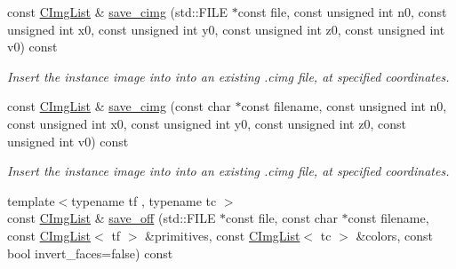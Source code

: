 \begin{DoxyCompactItemize}
\item 
\hypertarget{structcimg__library_1_1_c_img_list_a0445aab3748145df9c6654eaf4ca7947}{const \hyperlink{structcimg__library_1_1_c_img_list}{C\-Img\-List} \& \hyperlink{structcimg__library_1_1_c_img_list_a0445aab3748145df9c6654eaf4ca7947}{save\-\_\-cimg} (std\-::\-F\-I\-L\-E $\ast$const file, const unsigned int n0, const unsigned int x0, const unsigned int y0, const unsigned int z0, const unsigned int v0) const }\label{structcimg__library_1_1_c_img_list_a0445aab3748145df9c6654eaf4ca7947}

\begin{DoxyCompactList}\small\item\em Insert the instance image into into an existing .cimg file, at specified coordinates. \end{DoxyCompactList}\item 
\hypertarget{structcimg__library_1_1_c_img_list_a19dca264ff94f8694f6df722d4e272f8}{const \hyperlink{structcimg__library_1_1_c_img_list}{C\-Img\-List} \& \hyperlink{structcimg__library_1_1_c_img_list_a19dca264ff94f8694f6df722d4e272f8}{save\-\_\-cimg} (const char $\ast$const filename, const unsigned int n0, const unsigned int x0, const unsigned int y0, const unsigned int z0, const unsigned int v0) const }\label{structcimg__library_1_1_c_img_list_a19dca264ff94f8694f6df722d4e272f8}

\begin{DoxyCompactList}\small\item\em Insert the instance image into into an existing .cimg file, at specified coordinates. \end{DoxyCompactList}\item 
\hypertarget{structcimg__library_1_1_c_img_list_a4797a3f06678f05b3820b1e721b2190c}{{\footnotesize template$<$typename tf , typename tc $>$ }\\const \hyperlink{structcimg__library_1_1_c_img_list}{C\-Img\-List} \& \hyperlink{structcimg__library_1_1_c_img_list_a4797a3f06678f05b3820b1e721b2190c}{save\-\_\-off} (std\-::\-F\-I\-L\-E $\ast$const file, const char $\ast$const filename, const \hyperlink{structcimg__library_1_1_c_img_list}{C\-Img\-List}$<$ tf $>$ \&primitives, const \hyperlink{structcimg__library_1_1_c_img_list}{C\-Img\-List}$<$ tc $>$ \&colors, const bool invert\-\_\-faces=false) const }\label{structcimg__library_1_1_c_img_list_a4797a3f06678f05b3820b1e721b2190c}


\end{DoxyCompactItemize}

